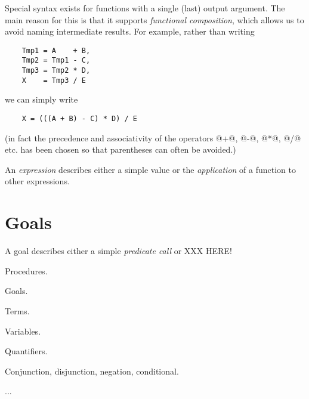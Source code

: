 Special syntax exists for functions with a single (last) output
argument.  The main reason for this is that it supports \emph{functional
composition}, which allows us to avoid naming intermediate results.  For
example, rather than writing
\begin{verbatim}
    Tmp1 = A    + B,
    Tmp2 = Tmp1 - C,
    Tmp3 = Tmp2 * D,
    X    = Tmp3 / E
\end{verbatim}
we can simply write
\begin{verbatim}
    X = (((A + B) - C) * D) / E
\end{verbatim}
(in fact the precedence and associativity of the operators @+@, @-@,
@*@, @/@ etc. has been chosen so that parentheses can often be
avoided.)

An \emph{expression} describes either a simple value or the
\emph{application} of a function to other expressions.



\section{Goals}

A goal describes either a simple \emph{predicate call} or XXX HERE!



Procedures.

Goals.

Terms.

Variables.

Quantifiers.

Conjunction, disjunction, negation, conditional.

...



